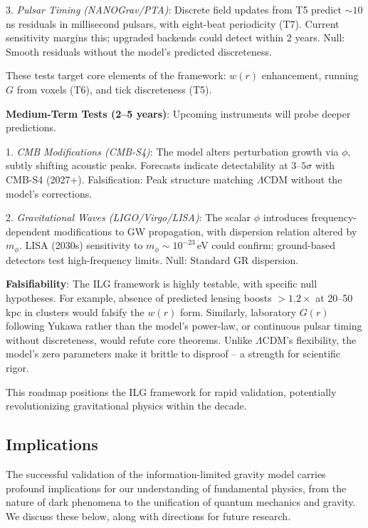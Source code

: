 \documentclass[12pt,a4paper]{article}
\begin{document}
3. \emph{Pulsar Timing (NANOGrav/PTA)}: Discrete field updates from T5 predict $\sim 10$\,ns residuals in millisecond pulsars, with eight-beat periodicity (T7). Current sensitivity margins this; upgraded backends could detect within 2 years. Null: Smooth residuals without the model's predicted discreteness.

These tests target core elements of the framework: $w(r)$ enhancement, running $G$ from voxels (T6), and tick discreteness (T5).

\textbf{Medium-Term Tests (2--5 years)}: Upcoming instruments will probe deeper predictions.

1. \emph{CMB Modifications (CMB-S4)}: The model alters perturbation growth via $\phi$, subtly shifting acoustic peaks. Forecasts indicate detectability at $3$--$5\sigma$ with CMB-S4 (2027+). Falsification: Peak structure matching $\Lambda$CDM without the model's corrections.

2. \emph{Gravitational Waves (LIGO/Virgo/LISA)}: The scalar $\phi$ introduces frequency-dependent modifications to GW propagation, with dispersion relation altered by $m_\phi$. LISA (2030s) sensitivity to $m_\phi \sim 10^{-23}$\,eV could confirm; ground-based detectors test high-frequency limits. Null: Standard GR dispersion.

\textbf{Falsifiability}: The ILG framework is highly testable, with specific null hypotheses. For example, absence of predicted lensing boosts $>1.2\times$ at 20--50\,kpc in clusters would falsify the $w(r)$ form. Similarly, laboratory $G(r)$ following Yukawa rather than the model's power-law, or continuous pulsar timing without discreteness, would refute core theorems. Unlike $\Lambda$CDM's flexibility, the model's zero parameters make it brittle to disproof -- a strength for scientific rigor.

This roadmap positions the ILG framework for rapid validation, potentially revolutionizing gravitational physics within the decade.

\subsection{Implications}

The successful validation of the information-limited gravity model carries profound implications for our understanding of fundamental physics, from the nature of dark phenomena to the unification of quantum mechanics and gravity. We discuss these below, along with directions for future research.
\end{document}
